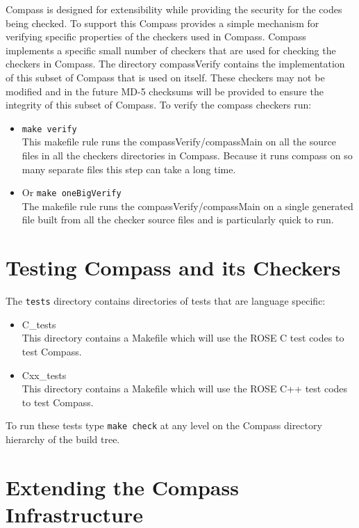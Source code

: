     Compass is designed for extensibility while providing the security for
the codes being checked.  To support this Compass provides a simple
mechanism for verifying specific properties of the checkers used in Compass.
Compass implements a specific small number of checkers that are used for checking
the checkers in Compass.  The directory compassVerify contains the implementation
of this subset of Compass that is used on itself.  These checkers may not
be modified and in the future MD-5 checksums will be provided to ensure the
integrity of this subset of Compass.  To verify the compass checkers run:
\begin{itemize}
   \item {\tt make verify} \\
        This makefile rule runs the compassVerify/compassMain on all the source files in
    all the checkers directories in Compass.  Because it runs compass on so
    many separate
    files this step can take a long time.
   \item Or {\tt make oneBigVerify} \\
        The makefile rule runs the compassVerify/compassMain on a single generated file
    built from all the checker source files and is particularly quick to run.
\end{itemize}



\section{Testing Compass and its Checkers}

   The {\tt tests} directory contains directories of tests that
are language specific:
\begin{itemize}
   \item C\_tests \\ 
         This directory contains a Makefile which will use the ROSE C test codes 
         to test Compass.
   \item Cxx\_tests \\ 
         This directory contains a Makefile which will use the ROSE C++ test codes 
         to test Compass.
\end{itemize}
To run these tests type {\tt make check} at any level on the Compass directory
hierarchy of the build tree.


\section{Extending the Compass Infrastructure}

